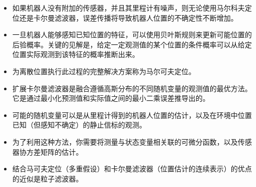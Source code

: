 \begin{itemize}
\item 如果机器人没有附加的传感器，并且其里程计有噪声，则无论使用马尔科夫定位还是卡尔曼滤波器，误差传播将导致机器人位置的不确定性不断增加。
\item 一旦机器人能够感知已知位置的特征，可以使用贝叶斯规则来更新可能位置的后验概率。关键的见解是，给定一定观测值的某个位置的条件概率可以从给定位置实际观测到该特征的概率推断出来。
\item 为离散位置执行此过程的完整解决方案称为马尔可夫定位。
\item 扩展卡尔曼滤波器是融合遵循高斯分布的不同随机变量的观测值的最优方法。
它是通过最小化预测值和实际值之间的最小二乘误差推导出的。
\item 可能的随机变量可以是从里程计得到的机器人位置的估计，以及在环境中位置已知（但感知不确定）的静止信标的观测。
\item 为了利用这种方法，你需要将测量与状态变量相关联的可微分函数，以及传感器协方差矩阵的估计。
\item 结合马可夫定位（多重假设）和卡尔曼滤波器（位置估计的连续表示）的优点的近似是粒子滤波器。
\end{itemize}

